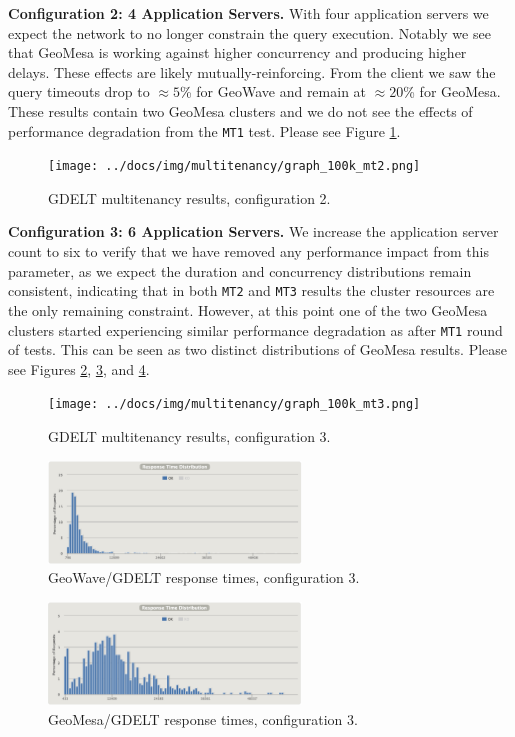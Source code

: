 {\bf Configuration 2: 4 Application Servers.}
With four application servers we expect the network to no longer constrain the query execution.
Notably we see that GeoMesa is working against higher concurrency and producing higher delays.
These effects are likely mutually-reinforcing.
From the client we saw the query timeouts drop to $ \approx 5$\% for GeoWave and remain at $\approx 20$\% for GeoMesa.
These results contain two GeoMesa clusters and we do not see the effects of performance degradation from the \texttt{MT1} test.
Please see Figure \ref{config2}.

\begin{figure}[h!tb]
  \centering
  \texttt{[image: ../docs/img/multitenancy/graph\_100k\_mt2.png]}
  \caption{GDELT multitenancy results, configuration 2.}
  \label{config2}
\end{figure}

{\bf Configuration 3: 6 Application Servers.}
We increase the application server count to six to verify that we have removed any performance impact from this parameter,
as we expect the duration and concurrency distributions remain consistent, indicating that in both \texttt{MT2} and \texttt{MT3} results the cluster resources are the only remaining constraint.
However, at this point one of the two GeoMesa clusters started experiencing similar performance degradation as after \texttt{MT1} round of tests.
This can be seen as two distinct distributions of GeoMesa results.
Please see Figures \ref{config3}, \ref{config3distrogw}, and \ref{config3distrogm}.

\begin{figure}[h!tb]
  \centering
  \texttt{[image: ../docs/img/multitenancy/graph\_100k\_mt3.png]}
  \caption{GDELT multitenancy results, configuration 3.}
  \label{config3}
\end{figure}

\begin{figure}[h!tb]
  \centering
  \includegraphics[width=0.60\textwidth]{images/mt3-2-gw.png}
  \caption{GeoWave/GDELT response times, configuration 3.}
  \label{config3distrogw}
\end{figure}

\begin{figure}[h!tb]
  \centering
  \includegraphics[width=0.60\textwidth]{images/mt3-2-gm.png}
  \caption{GeoMesa/GDELT response times, configuration 3.}
  \label{config3distrogm}
\end{figure}

